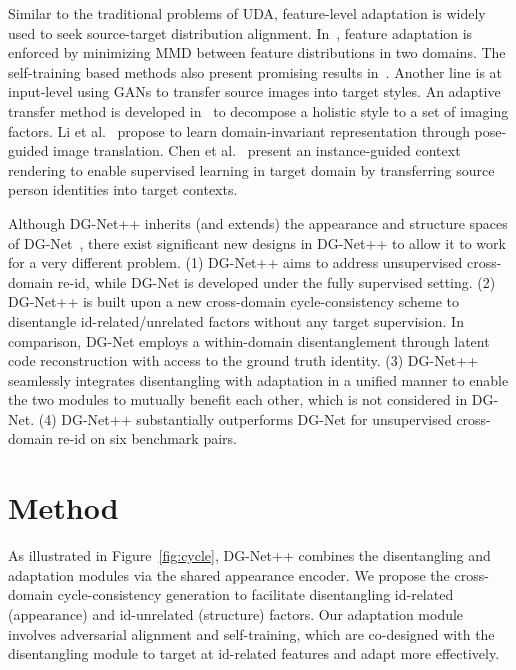 \documentclass[runningheads]{llncs}
\begin{document}
Similar to the traditional problems of UDA, feature-level adaptation is widely used to seek source-target distribution alignment. In~\cite{li2019cross,linmulti}, feature adaptation is enforced by minimizing MMD between feature distributions in two domains. The self-training based methods also present promising results in~\cite{song2018unsupervised}. Another line is at input-level using GANs to transfer source images into target styles. An adaptive transfer method is developed in~\cite{adaptive-transfer} to decompose a holistic style to a set of imaging factors. Li et al.~\cite{li2019cross} propose to learn domain-invariant representation through pose-guided image translation. Chen et al.~\cite{yanbei-chen} present an instance-guided context rendering to enable supervised learning in target domain by transferring source person identities into target contexts. 

Although DG-Net++ inherits (and extends) the appearance and structure spaces of DG-Net~\cite{zheng2019joint}, there exist significant new designs in DG-Net++ to allow it to work for a very different problem. (1) DG-Net++ aims to address unsupervised cross-domain re-id, while DG-Net is developed under the fully supervised setting. (2) DG-Net++ is built upon a new cross-domain cycle-consistency scheme to disentangle id-related/unrelated factors without any target supervision. In comparison, DG-Net employs a within-domain disentanglement through latent code reconstruction with access to the ground truth identity. (3) DG-Net++ seamlessly integrates disentangling with adaptation in a unified manner to enable the two modules to mutually benefit each other, which is not considered in DG-Net. (4) DG-Net++ substantially outperforms DG-Net for unsupervised cross-domain re-id on six benchmark pairs. 














\section{Method}

As illustrated in Figure~\ref{fig:cycle}, DG-Net++ combines the disentangling and adaptation modules via the shared appearance encoder. We propose the cross-domain cycle-consistency generation to facilitate disentangling id-related (appearance) and id-unrelated (structure) factors. Our adaptation module involves adversarial alignment and self-training, which are co-designed with the disentangling module to target at id-related features and adapt more effectively.  
\end{document}
